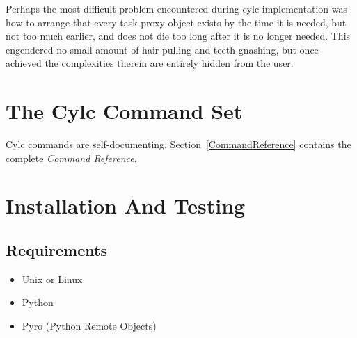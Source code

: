 \documentclass[11pt,a4paper]{article}
\begin{document}

Perhaps the most difficult problem encountered during cylc
implementation was how to arrange that every task proxy object exists by
the time it is needed, but not too much earlier, and does not die too
long after it is no longer needed. This engendered no small amount
of hair pulling and teeth gnashing, but once achieved the complexities
therein are entirely hidden from the user.




\pagebreak
\section{The Cylc Command Set}

Cylc commands are self-documenting. Section~\ref{CommandReference}
contains the complete {\em Command Reference}. 

\lstset{language=usage}


\pagebreak
\section{Installation And Testing} 
\label{InstallationAndTesting}

\subsection{Requirements} 
\label{Requirements}

\begin{itemize}
    \item Unix or Linux
    \item Python
    \item Pyro (Python Remote Objects)
\end{itemize}
\end{document}
